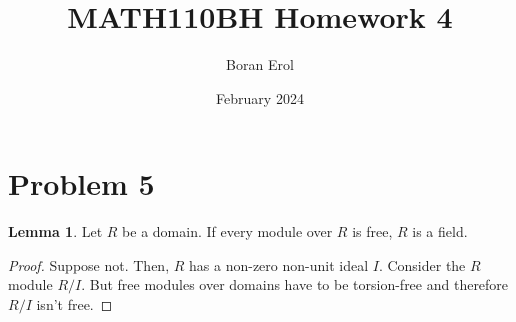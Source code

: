 \documentclass{article}
\title{MATH110BH Homework 4}
\date{February 2024}
\author{Boran Erol}
\theoremstyle{definition}
\newtheorem{lemma}[theorem]{Lemma}
\begin{document}
\maketitle

\section{Problem 5}

\begin{lemma}
    Let $ R $ be a domain. If every module over $ R $ is free, $ R $ is a field.
\end{lemma}
\begin{proof}
    Suppose not. Then, $ R $ has a non-zero non-unit ideal $ I $.
    Consider the $ R $ module $ R/I $. But free modules over domains have to be
    torsion-free and therefore $ R/I $ isn't free.
\end{proof}
\end{document}

